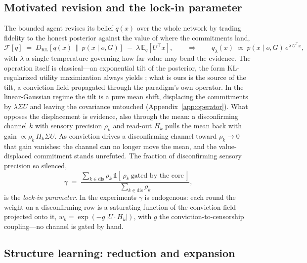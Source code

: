 \documentclass[11pt]{article}
\newcommand{\KL}[2]{D_{\mathrm{KL}}\!\left[#1\,\middle\|\,#2\right]}
\newcommand{\Eq}[2]{\mathbb{E}_{#1}\!\left[#2\right]}
\begin{document}
\subsection{Motivated revision and the lock-in parameter}
\label{sec:revision}

The bounded agent revises its belief $q(x)$ over the whole network by trading fidelity to the honest
posterior against the value of where the commitments land,
\begin{equation}
\mathcal{F}[q]\;=\;\KL{q(x)}{p(x\mid o,G)}\;-\;\lambda\,\Eq{q}{U^{\!\top}\!x},
\qquad\Longrightarrow\qquad
q_\lambda(x)\;\propto\;p(x\mid o,G)\,e^{\lambda\,U^{\!\top}\!x},
\label{eq:tilted}
\end{equation}
with $\lambda$ a single temperature governing how far value may bend the evidence. The operation
itself is classical---an exponential tilt of the posterior, the form KL-regularized utility
maximization always yields \citep{todorov2009,ortega2013}; what is ours is the source of the tilt, a
conviction field propagated through the paradigm's own operator. In the linear-Gaussian regime the
tilt is a pure mean shift, displacing the commitments by $\lambda\Sigma U$ and leaving the
covariance untouched (Appendix~\ref{app:operator}). What opposes the displacement is
evidence, also through the mean: a disconfirming channel $k$ with sensory precision $\rho_k$ and
read-out $H_k$ pulls the mean back with gain $\propto\rho_k\,H_k\Sigma U$. As conviction drives a
disconfirming channel toward $\rho_k\to0$ that gain vanishes: the channel can no longer move the
mean, and the value-displaced commitment stands unrefuted. The fraction of disconfirming sensory
precision so silenced,
\begin{equation}
\gamma\;=\;\frac{\sum_{k\in\mathrm{dis}}\rho_k\,\mathbb{1}[\,\rho_k\ \text{gated by the core}\,]}
{\sum_{k\in\mathrm{dis}}\rho_k},
\label{eq:gamma}
\end{equation}
is the \emph{lock-in parameter}. In the experiments $\gamma$ is endogenous: each round the weight on a
disconfirming row is a saturating function of the conviction field projected onto it,
$w_k=\exp(-g\,|U\!\cdot\!H_k|)$, with $g$ the conviction-to-censorship coupling---no channel is gated
by hand.

\subsection{Structure learning: reduction and expansion}
\label{sec:structurelearning}
\end{document}
